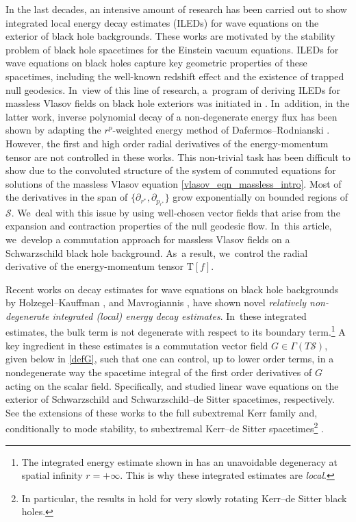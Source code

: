 \documentclass[10pt]{amsart}
\theoremstyle{plain}
\theoremstyle{definition}
\begin{document}
In the last decades, an intensive amount of research \cite{DR09, BS03, AB, TT11, DRSR, Aret11, Mos16, MS24} has been carried out to show integrated local energy decay estimates (ILEDs) for wave equations on the exterior of black hole backgrounds. These works are motivated by the stability problem of black hole spacetimes for the Einstein vacuum equations. ILEDs for wave equations on black holes capture key geometric properties of these spacetimes, including the well-known redshift effect and the existence of trapped null geodesics. In~view of this line of research, a~program of deriving ILEDs for massless Vlasov fields on black hole exteriors was initiated in \cite{ABJ,L23}. In~addition, in the latter work, inverse polynomial decay of a non-degenerate energy flux has been shown by adapting the $r^p$-weighted energy method of Dafermos--Rodnianski \cite{DR10}. However, the first and high order radial derivatives of the energy-momentum tensor are not controlled in these works. This non-trivial task has been difficult to show due to the convoluted structure of the system of commuted equations for solutions of the massless Vlasov equation \eqref{vlasov_eqn_massless_intro}. Most of the derivatives in the span of $\{\partial_{r^*}, \partial_{p_{r^*}}\}$ grow exponentially on bounded regions of $\mathcal{S}$. We~deal with this issue by using well-chosen vector fields that arise from the expansion and contraction properties of the null geodesic flow. In~this article, we~develop a commutation approach for massless Vlasov fields on a Schwarzschild black hole background. As~a result, we~control the radial derivative of the energy-momentum tensor $\mathrm{T}[f]$.

Recent works on decay estimates for wave equations on black hole backgrounds by Holzegel--Kauffman \cite{GK23}, and Mavrogiannis \cite{Mavr23}, have shown novel \emph{relatively non-degenerate integrated (local) energy decay estimates}. In~these integrated estimates, the bulk term is not degenerate with respect to its boundary term.\footnote{The integrated energy estimate shown in \cite{GK23} has an unavoidable degeneracy at spatial infinity $r=+\infty$. This is why these integrated estimates are \textit{local}.} A key ingredient in these estimates is a commutation vector field $G \in \Gamma (T\mathcal{S})$, given below in \eqref{defG}, such that one can control, up to lower order terms, in a nondegenerate way the spacetime integral of the first order derivatives of $G$ acting on the scalar field. Specifically, \cite{GK23} and \cite{Mavr23} studied linear wave equations on the exterior of Schwarzschild and Schwarzschild--de Sitter spacetimes, respectively. See the extensions of these works to the full subextremal Kerr family \cite{HKa23} and, conditionally to mode stability, to subextremal Kerr--de Sitter spacetimes\footnote{In particular, the results in \cite{mavrogiannis_2022} hold for very slowly rotating Kerr--de Sitter black holes.} \cite{mavrogiannis_2022}.
\end{document}

